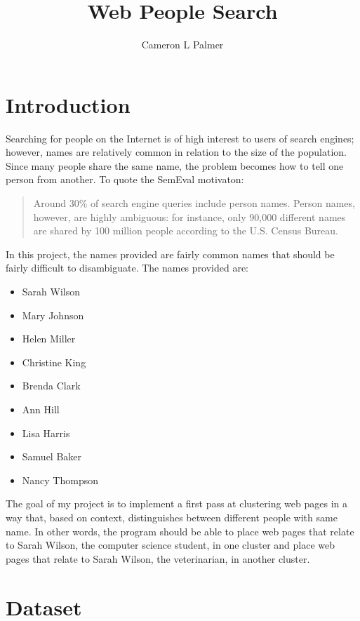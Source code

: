 \documentclass[12pt,twoside,letterpaper]{article}
\title{Web People Search}
\author{Cameron L Palmer}
\begin{document}
\maketitle
\thispagestyle{empty}
\newpage
\pagestyle{plain}
\section{Introduction}

Searching for people on the Internet is of high interest to users of search engines; however, names are relatively common in relation to the size of the population. Since many people share the same name, the problem becomes how to tell one person from another. To quote the SemEval motivaton:

\begin{quote}
Around 30\% of search engine queries include person names. Person names, however, are highly ambiguous: for instance, only 90,000 different names are shared by 100 million people according to the U.S. Census Bureau.
\end{quote}

In this project, the names provided are fairly common names that should be fairly difficult to disambiguate. The names provided are:
\begin{itemize}
\item Sarah Wilson
\item Mary Johnson
\item Helen Miller
\item Christine King
\item Brenda Clark
\item Ann Hill
\item Lisa Harris
\item Samuel Baker
\item Nancy Thompson
\end{itemize}

The goal of my project is to implement a first pass at clustering web pages in a way that, based on context, distinguishes between different people with same name.  In other words, the program should be able to place web pages that relate to Sarah Wilson, the computer science student, in one cluster and place web pages that relate to Sarah Wilson, the veterinarian, in another cluster. 



\section{Dataset}
\end{document}
